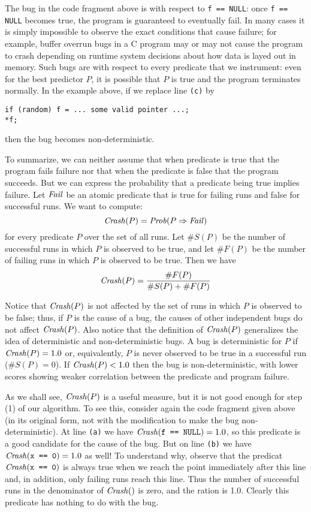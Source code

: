 The bug in the code fragment above is  with respect
to {\tt f == NULL}: once {\tt f == NULL} becomes true, the program is guaranteed to eventually
fail.  In many cases it is simply impossible to observe the exact
conditions that cause failure; for example, buffer overrun bugs in a C
program may or may not cause the program to crash depending on runtime
system decisions about how data is layed out in memory.  Such bugs are
 with respect to every predicate that we instrument:
even for the best predictor $P$, it is possible that $P$ is true and
the program terminates normally.  In the example above, if we replace line
{\tt (c)} by
\begin{verbatim}
if (random) f = ... some valid pointer ...;
*f;
\end{verbatim}
then the bug becomes non-deterministic.

To summarize, we can neither assume that when predicate is true that
the program fails failure nor that when the predicate is false that
the program succeeds. But we can express the probability that a predicate
being true implies failure.  Let $\mbox{\textit{Fail}}$ be an atomic predicate that is
true for failing runs and false for successful runs.  We want to compute:
\[ \mbox{\textit{Crash}}(P) = \mbox{\textit{Prob}}(P \Rightarrow \mbox{\textit{Fail}}) \]
for every predicate $P$ over the set of all runs.  Let $\#S(P)$ be the number
of successful runs in which $P$ is observed to be true, and let $\#F(P)$ be the number of
failing runs in which $P$ is observed to be true.  Then we have
\[ \mbox{\textit{Crash}}(P) = \frac{\#F(P)}{\#S(P) + \#F(P)} \]

Notice that $\mbox{\textit{Crash}}(P)$ is not affected by the set of runs in which
$P$ is observed to be false; thus, if $P$ is the cause of a bug, the
causes of other independent bugs do not affect $\mbox{\textit{Crash}}(P)$.  Also
notice that the definition of $\mbox{\textit{Crash}}(P)$ generalizes the idea of
deterministic and non-deterministic bugs.  A bug is deterministic for
$P$ if $\mbox{\textit{Crash}}(P) = 1.0$ or, equivalently, $P$ is never observed to be
true in a successful run ($\#S(P) = 0$). If $\mbox{\textit{Crash}}(P) < 1.0$ then the
bug is non-deterministic, with lower scores showing weaker correlation
between the predicate and program failure.

As we shall see, $\mbox{\textit{Crash}}(P)$ is a useful measure, but it is not good
enough for step (1) of our algorithm. To see this, consider again the
code fragment given above (in its original form, not with the
modification to make the bug non-deterministic).  At line {\tt (a)} we
have $\mbox{\textit{Crash}}(\mbox{\tt f == NULL}) = 1.0$, so this predicate is a good
candidate for the cause of the bug.  
But on line {\tt (b)} we have $\mbox{\textit{Crash}}(\mbox{\tt x == 0}) = 1.0$ as well!
To understand why, observe that the predicat $\mbox{\textit{Crash}}(\mbox{\tt x == 0})$ is always
true when we reach the point immediately after this line and, in addition, only failing runs reach this line.
Thus the number of successful runs in the denominator of $\mbox{\textit{Crash}}()$ is zero,
and the ration is 1.0. Clearly this predicate has nothing to do with the bug.

